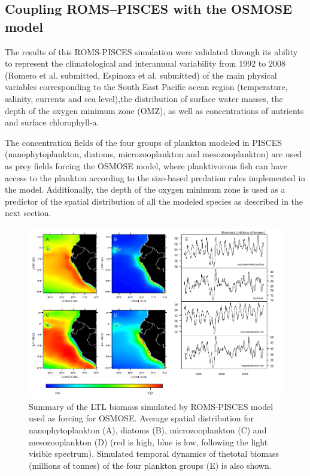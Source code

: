 \subsection{Coupling ROMS--PISCES with the OSMOSE model}

The results of this ROMS-PISCES simulation were validated through its ability to represent the climatological and interannual variability from 1992 to 2008 (Romero et al. submitted, Espinoza et al. submitted) of the main physical variables corresponding to the South East Pacific ocean region (temperature, salinity, currents and sea level),the distribution of surface water masses, the depth of the oxygen minimum zone (OMZ), as well as concentrations of nutrients and surface chlorophyll-a.  

The concentration fields of the four groups of plankton modeled in PISCES (nanophytoplankton, diatoms, microzooplankton and mesozooplankton) are used as prey fields forcing the OSMOSE model, where planktivorous fish can have access to the plankton according to the size-based predation rules implemented in the model. Additionally, the depth of the oxygen minimum zone is used as a predictor of the spatial distribution of all the modeled species as described in the next section.

\begin{figure}
\centering
\includegraphics[width=0.95\linewidth]{figures/figuraA1}
\caption{Summary of the LTL biomass simulated by ROMS-PISCES model used as forcing for OSMOSE. Average spatial distribution for nanophytoplankton (A), diatoms (B), microzooplankton (C) and mesozooplankton (D) (red is high, blue is low, following the light visible spectrum). Simulated temporal dynamics of thetotal biomass (millions of tonnes) of the four plankton groups (E) is also shown.}
\label{fig:figureA1}
\end{figure}




